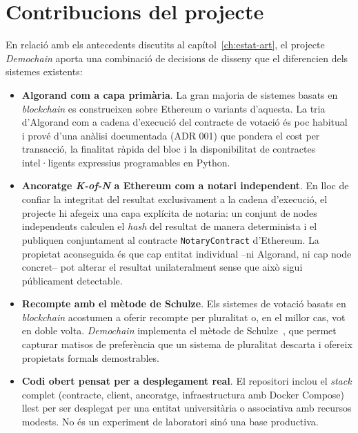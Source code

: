 

\section{Contribucions del projecte}
\label{sec:contribucions}

En relació amb els antecedents discutits al capítol~\ref{ch:estat-art}, el projecte \emph{Demochain} aporta una
combinació de decisions de disseny que el diferencien dels sistemes existents:

\begin{itemize}
    \item \textbf{Algorand com a capa primària}.
    La gran majoria de sistemes basats en \emph{blockchain} es construeixen sobre Ethereum o variants d'aquesta.
    La tria d'Algorand com a cadena d'execució del contracte de votació és poc habitual i prové d'una anàlisi
    documentada (\ac{ADR} 001) que pondera el cost per transacció, la finalitat ràpida del bloc i la disponibilitat de
    contractes intel·ligents expressius programables en Python.

    \item \textbf{Ancoratge \textit{K-of-N} a Ethereum com a notari independent}.
    En lloc de confiar la integritat del resultat exclusivament a la cadena d'execució, el projecte hi afegeix una capa
    explícita de notaria: un conjunt de nodes independents calculen el \emph{\textit{hash}} del resultat de manera
    determinista i el publiquen conjuntament al contracte \texttt{NotaryContract} d'Ethereum.
    La propietat aconseguida és que cap entitat individual --ni Algorand, ni cap node concret-- pot alterar el resultat
    unilateralment sense que això sigui públicament detectable.

    \item \textbf{Recompte amb el mètode de Schulze}.
    Els sistemes de votació basats en \emph{blockchain} acostumen a oferir recompte per pluralitat o, en el millor cas,
    vot en doble volta.
    \emph{Demochain} implementa el mètode de Schulze~\cite{schulze2011newmethod}, que permet capturar matisos de
    preferència que un sistema de pluralitat descarta i ofereix propietats formals demostrables.

    \item \textbf{Codi obert pensat per a desplegament real}.
    El repositori inclou el \emph{stack} complet (contracte, client, ancoratge, infraestructura amb Docker Compose)
    llest per ser desplegat per una entitat universitària o associativa amb recursos modests.
    No és un experiment de laboratori sinó una base productiva.
\end{itemize}

